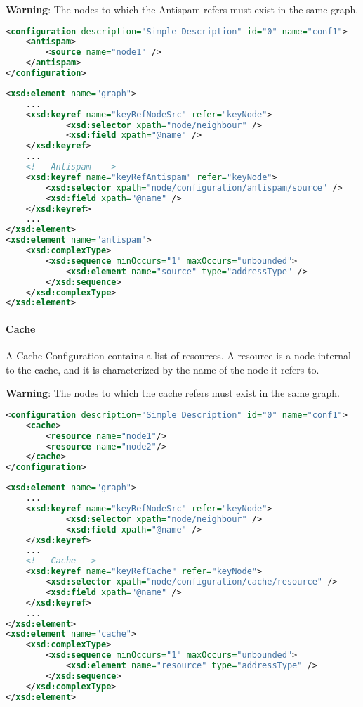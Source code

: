 \begin{warning}
\textbf{Warning}: The nodes to which the Antispam refers must exist in the same graph.
\end{warning}

\begin{lstlisting}[language=XML, caption=Antispam Configuration Example]
<configuration description="Simple Description" id="0" name="conf1">
    <antispam>
    	<source name="node1" />
    </antispam>
</configuration>
\end{lstlisting}

\begin{lstlisting}[language=XML, caption=Antispam schema code snippet]
<xsd:element name="graph">
    ...
    <xsd:keyref name="keyRefNodeSrc" refer="keyNode">
            <xsd:selector xpath="node/neighbour" />
            <xsd:field xpath="@name" />
    </xsd:keyref>
    ...
    <!-- Antispam  -->
    <xsd:keyref name="keyRefAntispam" refer="keyNode">
        <xsd:selector xpath="node/configuration/antispam/source" />
        <xsd:field xpath="@name" />
    </xsd:keyref>
    ...
</xsd:element>
<xsd:element name="antispam">
    <xsd:complexType>
        <xsd:sequence minOccurs="1" maxOccurs="unbounded">
            <xsd:element name="source" type="addressType" />
        </xsd:sequence>
    </xsd:complexType>
</xsd:element>
\end{lstlisting}

\paragraph{Cache}

A Cache Configuration contains a list of resources. A resource is a node internal to the cache, and it is characterized by the name of the node it refers to.

\begin{warning}
\textbf{Warning}: The nodes to which the cache refers must exist in the same graph.
\end{warning}

\begin{lstlisting}[language=XML, caption=Cache Configuration Example]
<configuration description="Simple Description" id="0" name="conf1">
    <cache>
    	<resource name="node1"/>
    	<resource name="node2"/>
    </cache>
</configuration>
\end{lstlisting}

\begin{lstlisting}[language=XML, caption=Cache schema code snippet]
<xsd:element name="graph">
    ...
    <xsd:keyref name="keyRefNodeSrc" refer="keyNode">
            <xsd:selector xpath="node/neighbour" />
            <xsd:field xpath="@name" />
    </xsd:keyref>
    ...
    <!-- Cache -->
    <xsd:keyref name="keyRefCache" refer="keyNode">
        <xsd:selector xpath="node/configuration/cache/resource" />
        <xsd:field xpath="@name" />
    </xsd:keyref>
    ...
</xsd:element>
<xsd:element name="cache">
    <xsd:complexType>
        <xsd:sequence minOccurs="1" maxOccurs="unbounded">
            <xsd:element name="resource" type="addressType" />
        </xsd:sequence>
    </xsd:complexType>
</xsd:element>
\end{lstlisting}

